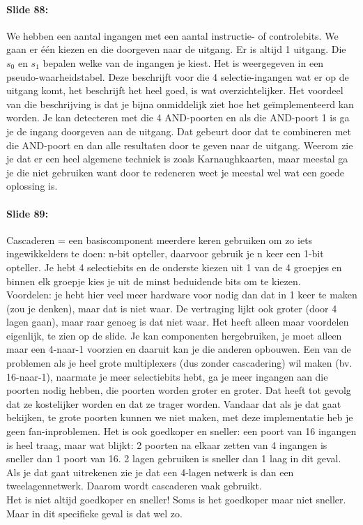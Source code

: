 \documentclass[10pt,a4paper]{book}
\begin{document}
\paragraph{Slide 88:} We hebben een aantal ingangen met een aantal instructie- of controlebits. We gaan er \'e\'en kiezen en die doorgeven naar de uitgang. Er is altijd 1 uitgang. Die $s_0$ en $s_1$  bepalen welke van de ingangen je kiest. Het is weergegeven in een pseudo-waarheidstabel. Deze beschrijft voor die 4 selectie-ingangen wat er op de uitgang komt, het beschrijft het heel goed, is wat overzichtelijker. Het voordeel van die beschrijving is dat je bijna onmiddelijk ziet hoe het ge\"implementeerd kan worden. Je kan detecteren met die 4 AND-poorten en als die AND-poort 1 is ga je de ingang doorgeven aan de uitgang. Dat gebeurt door dat te combineren met die AND-poort en dan alle resultaten door te geven naar de uitgang. Weerom zie je dat er een heel algemene techniek is zoals Karnaughkaarten, maar meestal ga je die niet gebruiken want door te redeneren weet je meestal wel wat een goede oplossing is.

\paragraph{Slide 89:} Cascaderen = een basiscomponent meerdere keren gebruiken om zo iets ingewikkelders te doen: n-bit opteller, daarvoor gebruik je n keer een 1-bit opteller. Je hebt 4 selectiebits en de onderste kiezen uit 1 van de 4 groepjes en binnen elk groepje kies je uit de minst beduidende bits om te kiezen.\\
Voordelen: je hebt hier veel meer hardware voor nodig dan dat in 1 keer te maken (zou je denken), maar dat is niet waar. De vertraging lijkt ook groter (door 4 lagen gaan), maar raar genoeg is dat niet waar. Het heeft alleen maar voordelen eigenlijk, te zien op de slide. Je kan componenten hergebruiken, je moet alleen maar een 4-naar-1 voorzien en daaruit kan je die anderen opbouwen. Een van de problemen als je heel grote multiplexers (dus zonder cascadering) wil maken (bv. 16-naar-1), naarmate je meer selectiebits hebt, ga je meer ingangen aan die poorten nodig hebben, die poorten worden groter en groter. Dat heeft tot gevolg dat ze kostelijker worden en dat ze trager worden. Vandaar dat als je dat gaat bekijken, te grote poorten kunnen we niet maken, met deze implementatie heb je geen fan-inproblemen. Het is ook goedkoper en sneller: een poort van 16 ingangen is heel traag, maar wat blijkt: 2 poorten na elkaar zetten van 4 ingangen is sneller dan 1 poort van 16. 2 lagen gebruiken is sneller dan 1 laag in dit geval. Als je dat gaat uitrekenen zie je dat een 4-lagen netwerk is dan een tweelagennetwerk. Daarom wordt cascaderen vaak gebruikt.\\
Het is niet altijd goedkoper en sneller! Soms is het goedkoper maar niet sneller. Maar in dit specifieke geval is dat wel zo.
\end{document}
